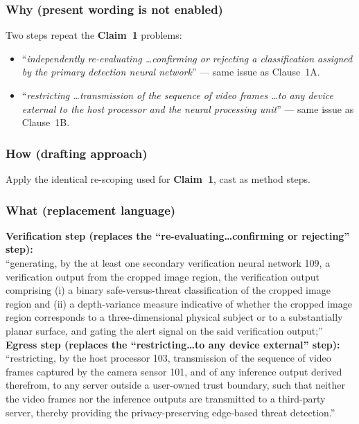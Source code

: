 \documentclass[12pt,a4paper]{article}
\newcommand{\clm}[1]{\textbf{Claim~#1}}
\begin{document}
\subsubsection{Why (present wording is not enabled)}
Two steps repeat the \clm{1} problems:
\begin{itemize}[leftmargin=1.4em,itemsep=2pt,topsep=2pt]
  \item ``\emph{independently re-evaluating \ldots confirming or rejecting a classification
        assigned by the primary detection neural network}'' --- same issue as Clause~1A.
  \item ``\emph{restricting \ldots transmission of the sequence of video frames \ldots to any
        device external to the host processor and the neural processing unit}'' --- same issue
        as Clause~1B.
\end{itemize}

\subsubsection{How (drafting approach)}
Apply the identical re-scoping used for \clm{1}, cast as method steps.

\subsubsection{What (replacement language)}
\begin{whatbox}
\textbf{Verification step (replaces the ``re-evaluating\ldots confirming or rejecting''
step):}\\
``generating, by the at least one secondary verification neural network 109, a verification
output from the cropped image region, the verification output comprising (i) a binary
safe-versus-threat classification of the cropped image region and (ii) a depth-variance
measure indicative of whether the cropped image region corresponds to a three-dimensional
physical subject or to a substantially planar surface, and gating the alert signal on the
said verification output;''
\\[6pt]
\textbf{Egress step (replaces the ``restricting\ldots to any device external'' step):}\\
``restricting, by the host processor 103, transmission of the sequence of video frames
captured by the camera sensor 101, and of any inference output derived therefrom, to any
server outside a user-owned trust boundary, such that neither the video frames nor the
inference outputs are transmitted to a third-party server, thereby providing the
privacy-preserving edge-based threat detection.''
\end{whatbox}
\end{document}
